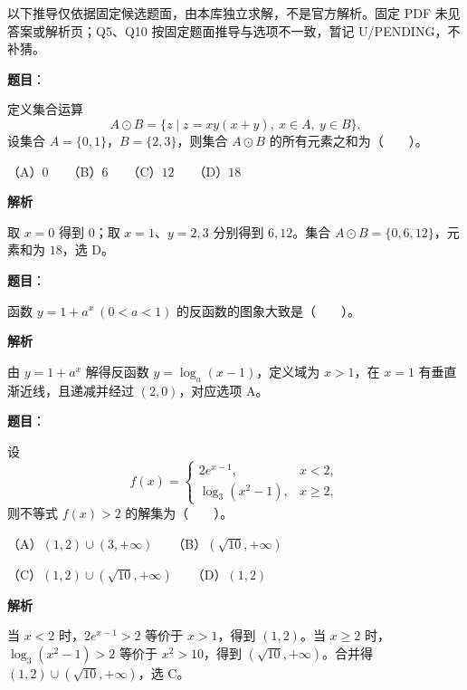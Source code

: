 

\begin{gktip}
以下推导仅依据固定候选题面，由本库独立求解，不是官方解析。固定 PDF 未见答案或解析页；Q5、Q10 按固定题面推导与选项不一致，暂记 U/PENDING，不补猜。
\end{gktip}

\begin{answer}

\textbf{题目}：

定义集合运算
\nopagebreak[4]
\[
A\odot B=\{z\mid z=xy(x+y),\ x\in A,\ y\in B\}.
\]
设集合 $A=\{0,1\}$，$B=\{2,3\}$，则集合 $A\odot B$ 的所有元素之和为\mbox{（　　）}。

（A）$0$　　（B）$6$　　（C）$12$　　（D）$18$

\textbf{解析}

取 $x=0$ 得到 $0$；取 $x=1$、$y=2,3$ 分别得到 $6,12$。集合 $A\odot B=\{0,6,12\}$，元素和为 $18$，选 D。


\end{answer}
\begin{answer}

\textbf{题目}：

函数 $y=1+a^x\ (0<a<1)$ 的反函数的图象大致是\mbox{（　　）}。
\nopagebreak[4]
\begin{center}\end{center}
\nopagebreak[4]
\textbf{解析}

由 $y=1+a^x$ 解得反函数 $y=\log_a(x-1)$，定义域为 $x>1$，在 $x=1$ 有垂直渐近线，且递减并经过 $(2,0)$，对应选项 A。


\end{answer}
\begin{answer}

\textbf{题目}：

设
\nopagebreak[4]
\[
f(x)=\begin{cases}
2e^{x-1}, & x<2,\\
\log_3(x^2-1), & x\ge 2,
\end{cases}
\]
则不等式 $f(x)>2$ 的解集为\mbox{（　　）}。

（A）$(1,2)\cup(3,+\infty)$　　（B）$(\sqrt{10},+\infty)$

（C）$(1,2)\cup(\sqrt{10},+\infty)$　　（D）$(1,2)$

\textbf{解析}

当 $x<2$ 时，$2e^{x-1}>2$ 等价于 $x>1$，得到 $(1,2)$。当 $x\ge2$ 时，$\log_3(x^2-1)>2$ 等价于 $x^2>10$，得到 $(\sqrt{10},+\infty)$。合并得 $(1,2)\cup(\sqrt{10},+\infty)$，选 C。


\end{answer}
